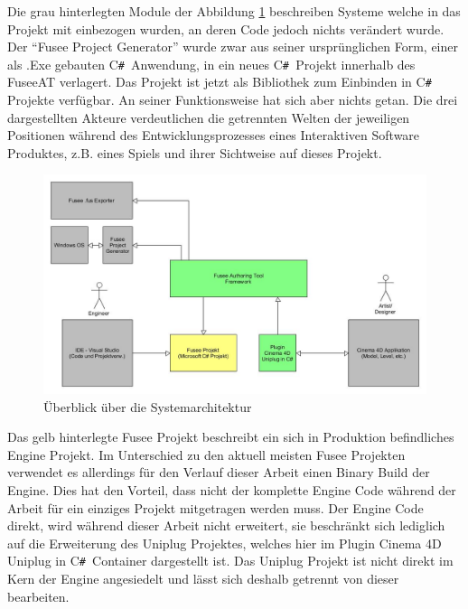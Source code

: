 \documentclass[pagesize, paper=a4, fontsize=12pt, titlepage=true, headings=small, headnosepline, abstractoff, liststotoc, nochapterprefix, plainheadsepline, twoside]{scrreprt}
\newcommand{\CSS}{C\texttt{\# }}
\begin{document}
Die grau hinterlegten Module der Abbildung \ref{FuseeATSystemÜberblick} beschreiben Systeme welche in das Projekt mit einbezogen wurden, an deren Code jedoch nichts verändert wurde. Der “Fusee Project Generator” wurde zwar aus seiner ursprünglichen Form, einer als .Exe gebauten \CSS Anwendung, in ein neues \CSS Projekt innerhalb des FuseeAT verlagert. Das Projekt ist jetzt als Bibliothek zum Einbinden in \CSS Projekte verfügbar. An seiner Funktionsweise hat sich aber nichts getan. Die drei dargestellten Akteure verdeutlichen die getrennten Welten der jeweiligen Positionen während des Entwicklungsprozesses eines Interaktiven Software Produktes, z.B. eines Spiels und ihrer Sichtweise auf dieses Projekt.
\begin{figure}[ht]
	\centering
	\includegraphics[width=\linewidth]{Bilder/Ueberblick_System.jpg}
	\caption{Überblick über die Systemarchitektur}
	\label{FuseeATSystemÜberblick}
\end{figure}
Das gelb hinterlegte Fusee Projekt beschreibt ein sich in Produktion befindliches Engine Projekt. Im Unterschied zu den aktuell meisten Fusee Projekten verwendet es allerdings für den Verlauf dieser Arbeit einen Binary Build der Engine. Dies hat den Vorteil, dass nicht der komplette Engine Code während der Arbeit für ein einziges Projekt mitgetragen werden muss. Der Engine Code direkt, wird während dieser Arbeit nicht erweitert, sie beschränkt sich lediglich auf die Erweiterung des Uniplug Projektes, welches hier im Plugin Cinema 4D Uniplug in \CSS Container dargestellt ist. Das Uniplug Projekt ist nicht direkt im Kern der Engine angesiedelt und lässt sich deshalb getrennt von dieser bearbeiten.
\\
\end{document}
